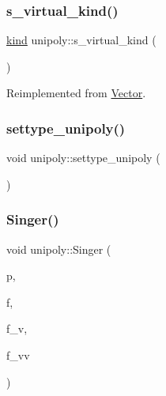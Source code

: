 \subsubsection{\texorpdfstring{s\+\_\+virtual\+\_\+kind()}{s\_virtual\_kind()}}
{\footnotesize\ttfamily \mbox{\hyperlink{discreta_8h_aaf25ee7e2306d78c74ec7bc48f092e81}{kind}} unipoly\+::s\+\_\+virtual\+\_\+kind (\begin{DoxyParamCaption}{ }\end{DoxyParamCaption})\hspace{0.3cm}{\ttfamily [virtual]}}



Reimplemented from \mbox{\hyperlink{class_vector_a20550e70d02cbe484032c7f6b0833a0f}{Vector}}.

\mbox{\label{classunipoly_a8db854fcc85c5e1150b1f1b1c005c95b}} 
\subsubsection{\texorpdfstring{settype\+\_\+unipoly()}{settype\_unipoly()}}
{\footnotesize\ttfamily void unipoly\+::settype\+\_\+unipoly (\begin{DoxyParamCaption}{ }\end{DoxyParamCaption})}

\mbox{\label{classunipoly_a3a5c0cc82d0d750bd47799046a4dc59e}} 
\subsubsection{\texorpdfstring{Singer()}{Singer()}}
{\footnotesize\ttfamily void unipoly\+::\+Singer (\begin{DoxyParamCaption}\item[{\mbox{\hyperlink{galois_8h_a09fddde158a3a20bd2dcadb609de11dc}{I\+NT}}}]{p,  }\item[{\mbox{\hyperlink{galois_8h_a09fddde158a3a20bd2dcadb609de11dc}{I\+NT}}}]{f,  }\item[{\mbox{\hyperlink{galois_8h_a09fddde158a3a20bd2dcadb609de11dc}{I\+NT}}}]{f\+\_\+v,  }\item[{\mbox{\hyperlink{galois_8h_a09fddde158a3a20bd2dcadb609de11dc}{I\+NT}}}]{f\+\_\+vv }\end{DoxyParamCaption})}

